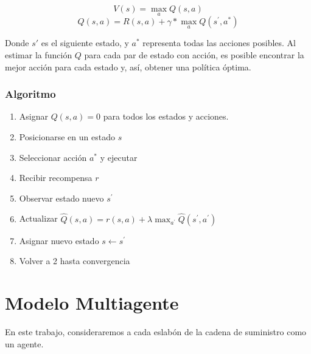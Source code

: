 

$$
V(s) = \max_{a}{Q(s,a)}
$$
$$
Q(s, a) = R(s, a) + \gamma * \max_{a}{Q(s^{'}, a^{*})}
$$

Donde $s{'}$ es el siguiente estado, y $a^{*}$ representa todas las acciones posibles. Al estimar la funci\'on $Q$ para cada par de estado con acci\'on, es posible encontrar la mejor acci\'on para cada estado y, as\'i, obtener una pol\'itica \'optima.

\subsubsection{Algoritmo}

\begin{enumerate}
    \item Asignar $Q(s,a) = 0$ para todos los estados y acciones.
    \item Posicionarse en un estado $s$
    \item Seleccionar acci\'on $a^{*}$ y ejecutar
    \item Recibir recompensa $r$
    \item Observar estado nuevo $s^{'}$
    \item Actualizar $\hat{Q}(s,a) = r(s,a) + \lambda \max _{ a^{'} }{  \hat{Q}(s^{'},a^{'}) }$
    \item Asignar nuevo estado $s \leftarrow s^{'}$
    \item Volver a 2 hasta convergencia
\end{enumerate}



\section{Modelo Multiagente}



En este trabajo, consideraremos a cada eslab\'on de la cadena de suministro como un agente. 

